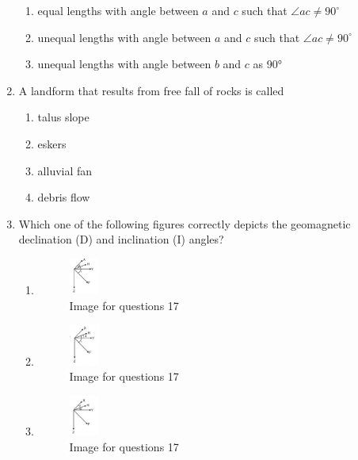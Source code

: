 \documentclass[journal,12pt,onecolumn]{IEEEtran}
\theoremstyle{remark}
\begin{document}
\begin{enumerate}
\begin{enumerate}
\item equal lengths with angle between \( a \) and \( c \) such that \( \angle ac \neq 90^\circ \)  
\item unequal lengths with angle between \( a \) and \( c \) such that \( \angle ac \neq 90^\circ \)
\item unequal lengths with angle between \(b\) and \(c\) as 90°  
\end{enumerate}

\item A landform that results from free fall of rocks is called  
\begin{multicols}{4}
\begin{enumerate}
\item talus slope  
\item eskers  
\item alluvial fan  
\item debris flow  
\end{enumerate}
\end{multicols}

\item Which one of the following figures correctly depicts the geomagnetic declination (D) and inclination (I) angles?  
\begin{multicols}{2}
\begin{enumerate}
\item \begin{figure}[H]
    \centering
    \includegraphics[width=0.1\textwidth]{figs/fig2.png}
    \caption{Image for questions 17}
    \label{fig:question17a}
\end{figure}

\item \begin{figure}[H]
    \centering
    \includegraphics[width=0.1\textwidth]{figs/fig3.png}
    \caption{Image for questions 17}
    \label{fig:question17b}
\end{figure}

\item \begin{figure}[H]
    \centering
    \includegraphics[width=0.1\textwidth]{figs/fig4.png}
    \caption{Image for questions 17}
    \label{fig:question17c}
\end{figure}


\end{enumerate}
\end{multicols}
\end{enumerate}
\end{document}

